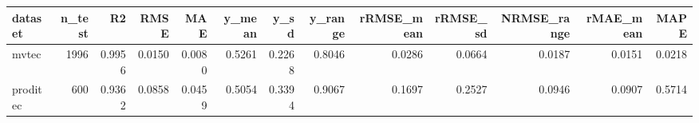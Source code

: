 \begin{tabular}{lrrrrrrrrrrrr}
\toprule
 dataset &  n\_test &     R2 &   RMSE &    MAE &  y\_mean &   y\_sd &  y\_range &  rRMSE\_mean &  rRMSE\_sd &  NRMSE\_range &  rMAE\_mean &   MAPE \\
\midrule
   mvtec &    1996 & 0.9956 & 0.0150 & 0.0080 &  0.5261 & 0.2268 &   0.8046 &      0.0286 &    0.0664 &       0.0187 &     0.0151 & 0.0218 \\
proditec &     600 & 0.9362 & 0.0858 & 0.0459 &  0.5054 & 0.3394 &   0.9067 &      0.1697 &    0.2527 &       0.0946 &     0.0907 & 0.5714 \\
\bottomrule
\end{tabular}
